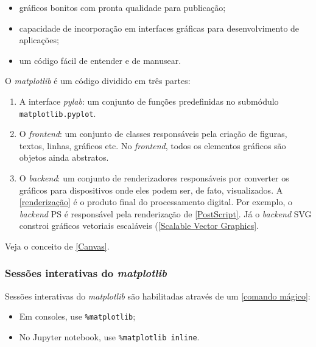 \documentclass[11pt]{article}
\providecommand{\tightlist}{%
      \setlength{\itemsep}{0pt}\setlength{\parskip}{0pt}}
\begin{document}
\begin{itemize}
\tightlist
\item
  gráficos bonitos com pronta qualidade para publicação;
\item
  capacidade de incorporação em interfaces gráficas para desenvolvimento
  de aplicações;
\item
  um código fácil de entender e de manusear.
\end{itemize}

O \emph{matplotlib} é um código dividido em três partes:

\begin{enumerate}
\def\labelenumi{\arabic{enumi}.}
\tightlist
\item
  A interface \emph{pylab}: um conjunto de funções predefinidas no
  submódulo \texttt{matplotlib.pyplot}.
\item
  O \emph{frontend}: um conjunto de classes responsáveis pela criação de
  figuras, textos, linhas, gráficos etc. No \emph{frontend}, todos os
  elementos gráficos são objetos ainda abstratos.
\item
  O \emph{backend}: um conjunto de renderizadores responsáveis por
  converter os gráficos para dispositivos onde eles podem ser, de fato,
  visualizados. A
  \href{https://pt.wikipedia.org/wiki/Renderização}{{[}renderização{]}}
  é o produto final do processamento digital. Por exemplo, o
  \emph{backend} PS é responsável pela renderização de
  \href{https://www.adobe.com/br/products/postscript.html}{{[}PostScript{]}}.
  Já o \emph{backend} SVG constroi gráficos vetoriais escaláveis
  (\href{https://www.w3.org/Graphics/SVG/}{{[}Scalable Vector
  Graphics{]}}.
\end{enumerate}

Veja o conceito de
\href{https://en.wikipedia.org/wiki/Canvas_(GUI)}{{[}Canvas{]}}.

\hypertarget{sessuxf5es-interativas-do-matplotlib}{%
\subsubsection{\texorpdfstring{Sessões interativas do
\emph{matplotlib}}{Sessões interativas do matplotlib}}\label{sessuxf5es-interativas-do-matplotlib}}

Sessões interativas do \emph{matplotlib} são habilitadas através de um
\href{https://ipython.readthedocs.io/en/stable/interactive/magics.html}{{[}comando
mágico{]}}:

\begin{itemize}
\tightlist
\item
  Em consoles, use \texttt{\%matplotlib};
\item
  No Jupyter notebook, use \texttt{\%matplotlib\ inline}.
\end{itemize}
\end{document}
